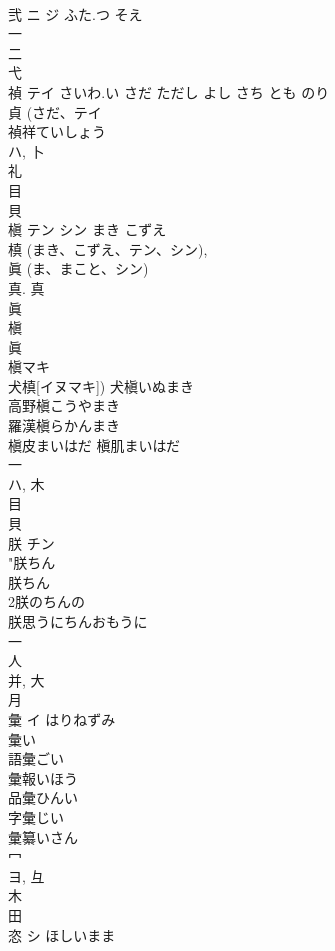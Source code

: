\documentclass[8pt]{extreport}
\begin{document}
\begin{CJK}{UTF8}{min}
\\	弐	ニ ジ	ふた.つ そえ	
\\	一 
\\	二 
\\	弋 
\\	禎	テイ	さいわ.い さだ ただし よし さち とも のり	
\\	貞 (さだ、テイ 
\\	禎祥ていしょう
\\	ハ, 卜 
\\	礼 
\\	目 
\\	貝 
\\	槇	テン シン	まき こずえ	
\\	槙 (まき、こずえ、テン、シン), 
\\	眞 (ま、まこと、シン) 
\\	真. 真 
\\	眞 
\\	槇 
\\	眞 
\\	槇マキ 
\\	犬槙[イヌマキ]) 犬槇いぬまき 
\\	高野槇こうやまき 
\\	羅漢槇らかんまき 
\\	槇皮まいはだ 槇肌まいはだ 
\\	一 
\\	ハ, 木 
\\	目 
\\	貝 
\\	朕	チン		
\\	"朕ちん
\\	朕ちん
\\	2朕のちんの
\\	朕思うにちんおもうに
\\	一 
\\	人 
\\	并, 大 
\\	月 
\\	彙	イ	はりねずみ	
\\	彙い
\\	語彙ごい
\\	彙報いほう
\\	品彙ひんい
\\	字彙じい
\\	彙纂いさん
\\	冖 
\\	ヨ, 彑 
\\	木 
\\	田 
\\	恣	シ	ほしいまま	

\end{CJK}
\end{document}
